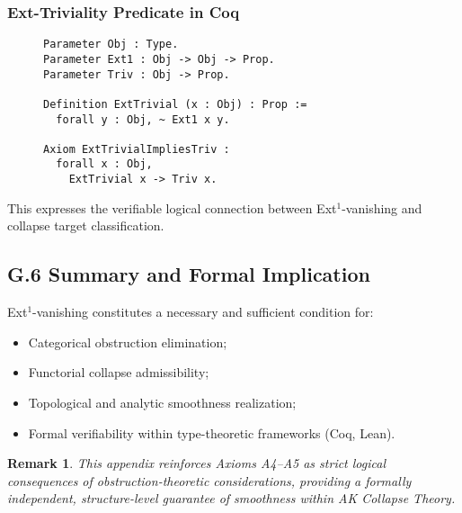 \documentclass[11pt]{article}
\newtheorem{remark}[theorem]{Remark}
\begin{document}
\subsubsection*{Ext-Triviality Predicate in Coq}

\begin{figure}[h]
\centering
\begin{lstlisting}[language=Coq, caption=Ext-Triviality and Collapse Formalization]
Parameter Obj : Type.
Parameter Ext1 : Obj -> Obj -> Prop.
Parameter Triv : Obj -> Prop.

Definition ExtTrivial (x : Obj) : Prop :=
  forall y : Obj, ~ Ext1 x y.

Axiom ExtTrivialImpliesTriv :
  forall x : Obj,
    ExtTrivial x -> Triv x.
\end{lstlisting}
\end{figure}

This expresses the verifiable logical connection between Ext$^1$-vanishing and collapse target classification.

\subsection*{G.6 Summary and Formal Implication}

Ext$^1$-vanishing constitutes a necessary and sufficient condition for:

\begin{itemize}
    \item Categorical obstruction elimination;
    \item Functorial collapse admissibility;
    \item Topological and analytic smoothness realization;
    \item Formal verifiability within type-theoretic frameworks (Coq, Lean).
\end{itemize}

\begin{remark}
This appendix reinforces Axioms A4–A5 as strict logical consequences of obstruction-theoretic considerations, providing a formally independent, structure-level guarantee of smoothness within AK Collapse Theory.
\end{remark}



\end{document}
